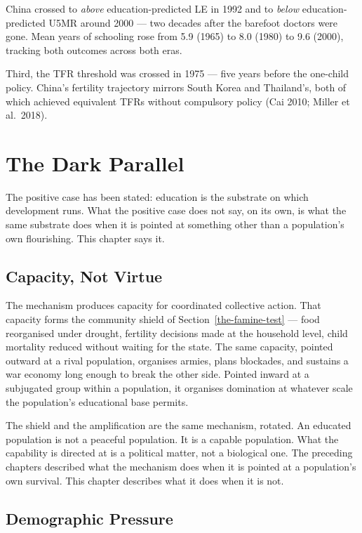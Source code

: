 \documentclass[12pt,letterpaper]{article}
\begin{document}
China crossed to \emph{above} education-predicted LE in 1992 and to
\emph{below} education-predicted U5MR around 2000 --- two decades after
the barefoot doctors were gone. Mean years of schooling rose from 5.9
(1965) to 8.0 (1980) to 9.6 (2000), tracking both outcomes across both
eras.

Third, the TFR threshold was crossed in
1975 --- five years before the one-child policy. China's
fertility trajectory mirrors South Korea and Thailand's, both of
which achieved equivalent TFRs without compulsory policy (Cai 2010; Miller et
al.~2018).

\section{The Dark Parallel}\label{the-dark-parallel}

The positive case has been stated: education is the substrate on which
development runs. What the positive case does not say, on its own, is
what the same substrate does when it is pointed at something other than
a population's own flourishing. This chapter says it.

\subsection{Capacity, Not Virtue}\label{capacity-not-virtue}

The mechanism produces capacity for coordinated collective action. That
capacity forms the community shield of Section~\ref{the-famine-test} ---
food reorganised under drought, fertility decisions made at the
household level, child mortality reduced without waiting for the state.
The same capacity, pointed outward at a rival population, organises
armies, plans blockades, and sustains a war economy long enough to
break the other side. Pointed inward at a subjugated group within a
population, it organises domination at whatever scale the population's
educational base permits.

The shield and the amplification are the same mechanism, rotated. An
educated population is not a peaceful population. It is a capable
population. What the capability is directed at is a political matter,
not a biological one. The preceding chapters described what the
mechanism does when it is pointed at a population's own survival. This
chapter describes what it does when it is not.

\subsection{Demographic Pressure}\label{demographic-pressure}
\end{document}
